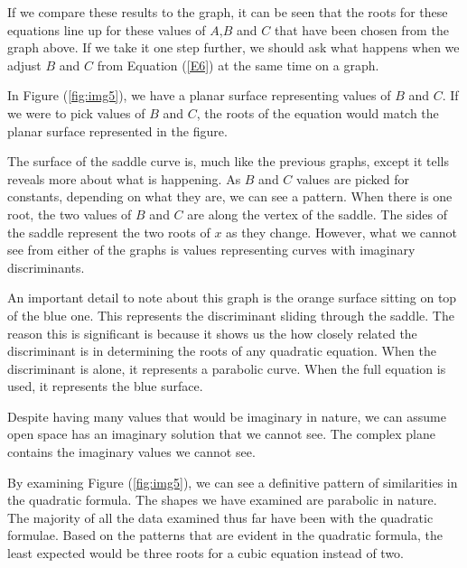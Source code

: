 \documentclass[14pt]{extarticle}
\begin{document}
\indent If we compare these results to the graph, it can be seen that the roots for these equations line up for these values of $A$,$B$ and $C$ that have been chosen from the graph above. If we take it one step further, we should ask what happens when we adjust $B$ and $C$ from Equation (\ref{E6}) at the same time on a graph.

\indent In Figure (\ref{fig:img5}), we have a planar surface representing values of $B$ and $C$. If we were to pick values of $B$ and $C$, the roots of the equation would match the planar surface represented in the figure.

\indent The surface of the saddle curve is, much like the previous graphs, except it tells reveals more about what is happening. As $B$ and $C$ values are picked for constants, depending on what they are, we can see a pattern. When there is one root, the two values of $B$ and $C$ are along the vertex of the saddle. The sides of the saddle represent the two roots of $x$ as they change. However, what we cannot see from either of the graphs is values representing curves with imaginary discriminants.

\indent An important detail to note about this graph is the orange surface sitting on top of the blue one. This represents the discriminant sliding through the saddle. The reason this is significant is because it shows us the how closely related the discriminant is in determining the roots of any quadratic equation. When the discriminant is alone, it represents a parabolic curve. When the full equation is used, it represents the blue surface.


\indent Despite having many values that would be imaginary in nature, we can assume open space has an imaginary solution that we cannot see. The complex plane contains the imaginary values we cannot see.



\indent By examining Figure (\ref{fig:img5}), we can see a definitive pattern of similarities in the quadratic formula. The shapes we have examined are parabolic in nature. The majority of all the data examined thus far have been with the quadratic formulae. Based on the patterns that are evident in the quadratic formula, the least expected would be three roots for a cubic equation instead of two.
\end{document}
